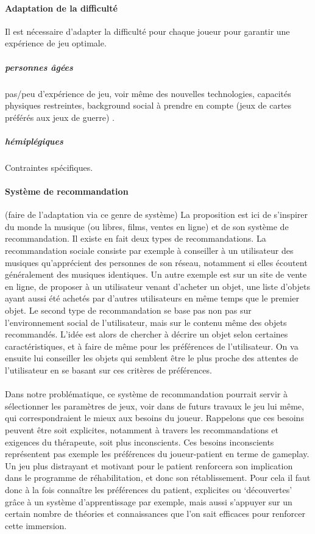 			\paragraph{Adaptation de la difficulté\\}
Il est nécessaire d'adapter la difficulté pour chaque joueur pour garantir une expérience de jeu optimale.			
				\subparagraph{personnes âgées\\}
pas/peu d'expérience de jeu, voir même des nouvelles technologies, capacités physiques restreintes, background social à prendre en compte (jeux de cartes préférés aux jeux de guerre) \cite{Csik75}.
				\subparagraph{hémiplégiques\\}		
Contraintes spécifiques.					
			\paragraph{Système de recommandation \\}
(faire de l'adaptation via ce genre de système)
La proposition est ici de s'inspirer du monde la musique (ou libres, films, ventes en ligne) et de son système de recommandation. Il existe en fait deux types de recommandations. La recommandation sociale consiste par exemple à conseiller à un utilisateur des musiques qu'apprécient des personnes de son réseau, notamment si elles écoutent généralement des musiques identiques. Un autre exemple est sur un site de vente en ligne, de proposer à un utilisateur venant d'acheter un objet, une liste d'objets ayant aussi été achetés par d'autres utilisateurs en même temps que le premier objet.
Le second type de recommandation se base pas non pas sur l'environnement social de l'utilisateur, mais sur le contenu même des objets recommandés. L'idée est alors de chercher à décrire un objet selon certaines caractéristiques, et à faire de même pour les préférences de l'utilisateur. On va ensuite lui conseiller les objets qui semblent être le plus proche des attentes de l'utilisateur en se basant sur ces critères de préférences. 
 \paragraph{}
 Dans notre problématique, ce système de recommandation pourrait servir à sélectionner les paramètres de jeux, voir dans de futurs travaux le jeu lui même, qui correspondraient le mieux aux besoins du joueur. Rappelons que ces besoins peuvent être soit explicites, notamment à travers les recommandations et exigences du thérapeute, soit plus inconscients. Ces besoins inconscients représentent pas exemple les préférences du joueur-patient en terme de gameplay. Un jeu plus distrayant et motivant pour le patient renforcera son implication dans le programme de réhabilitation, et donc son rétablissement. Pour cela il faut donc à la fois connaître les préférences du patient, explicites ou `découvertes'  grâce à un système d'apprentissage par exemple, mais aussi s'appuyer sur un certain nombre de théories et connaissances que l'on sait efficaces pour renforcer cette immersion. 		
